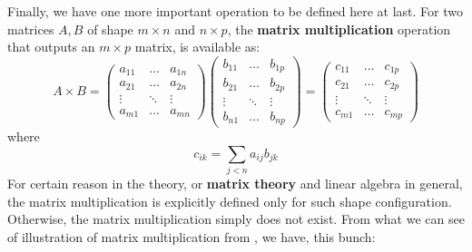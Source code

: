 Finally, we have one more important operation to be defined here at last. For two matrices $A,B$ of shape $m\times n$ and $n\times p$, the \textbf{matrix multiplication} operation that outputs an $m\times p$ matrix, is available as: 
\begin{equation}
    A\times B = \begin{pmatrix}
        a_{11} & \dots & a_{1n} \\
        a_{21} & \dots & a_{2n} \\
        \vdots & \ddots & \vdots \\
        a_{m1} & \dots & a_{mn}
    \end{pmatrix}
    \begin{pmatrix}
        b_{11} & \dots & b_{1p} \\
        b_{21} & \dots & b_{2p} \\
        \vdots & \ddots & \vdots \\
        b_{n1} & \dots & b_{np}
    \end{pmatrix} = 
    \begin{pmatrix}
        c_{11} & \dots & c_{1p} \\
        c_{21} & \dots & c_{2p} \\
        \vdots & \ddots & \vdots \\
        c_{m1} & \dots & c_{mp}
    \end{pmatrix}
\end{equation}
where \begin{equation}
    c_{ik} = \sum_{j<n} a_{ij}b_{jk}
\end{equation}
For certain reason in the theory, or \textbf{matrix theory} and linear algebra in general, the matrix multiplication is explicitly defined only for such shape configuration. Otherwise, the matrix multiplication simply does not exist. From what we can see of illustration of matrix multiplication from \cite{ANDRILLI20101}, we have, this bunch:
